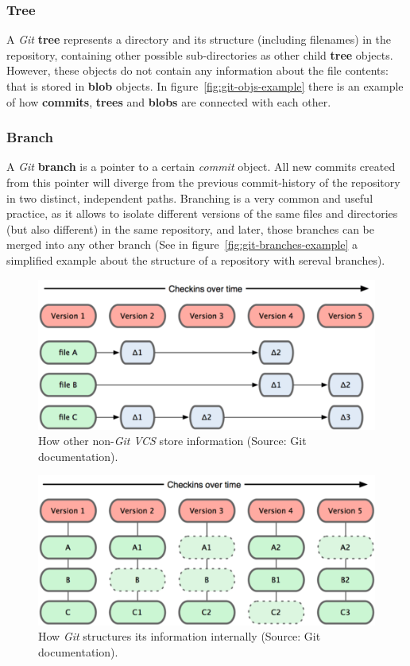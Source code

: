 \documentclass[a4paper, 12pt]{book}
\begin{document}
\subsubsection{Tree}
A \emph{Git} \textbf{tree} represents a directory and its structure (including filenames) in the repository, containing other possible
sub-directories as other child \textbf{tree} objects. However, these objects do not contain any information about the file contents:
that is stored in \textbf{blob} objects. In figure~\ref{fig:git-objs-example} there is an example of how \textbf{commits},
\textbf{trees} and \textbf{blobs} are connected with each other.
\subsubsection{Branch}
A \emph{Git} \textbf{branch} is a pointer to a certain \emph{commit} object. All new commits
created from this pointer will diverge from the previous commit-history of the repository in two distinct, independent paths.
Branching is a very common and useful practice, as it allows to isolate different versions of the same files and directories
(but also different) in the same repository, and later, those branches can be merged into any other branch (See in
figure~\ref{fig:git-branches-example} a simplified example about the structure of a repository with sereval branches).
\begin{figure}
  \centering
  \includegraphics[width=12cm, keepaspectratio]{img/deltas-not-git}
  \caption{How other non-\emph{Git} \emph{VCS} store information (Source: Git documentation).}
  \label{fig:info-not-git}
\end{figure}
\begin{figure}
  \centering
  \includegraphics[width=12cm, keepaspectratio]{img/snapshots-git}
  \caption{How \emph{Git} structures its information internally (Source: Git documentation).}
  \label{fig:info-git}
\end{figure}
\end{document}
